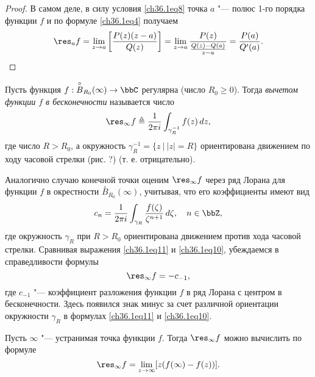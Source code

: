 \begin{proof}
В самом деле, в силу условия \eqref{ch36.1eq8} точка $a$ "--- полюс 1-го порядка функции $f$ и по формуле  \eqref{ch36.1eq4} получаем
\begin{equation*}
\res_{a} f = \lim_{z \to a} \left[ \frac{P(z)(z - a)}{Q(z)}\right] = \lim_{z \to a} \frac{P(z)}{\frac{Q(z) - Q(a)}{z - a}} = \frac{P(a)}{Q'(a)}. \qedhere
\end{equation*}
\end{proof}

\begin{defn} \label{ch36defn2}
Пусть функция $f : \overset{\circ}{B}_{R_0}(\infty) \to \bbC$ регулярна (число $R_0 \ge 0$). Тогда \textit{вычетом функции $f$ в бесконечности} называется число
\begin{equation} \label{ch36.1eq10}
\res_{\infty} f \triangleq \frac{1}{2\pi i} \int_{\gamma_R^{-1}} f(z) \,dz,
\end{equation}
где число $R > R_0$, а окружность $\gamma_R^{-1} = \{ z \: \big| \: |z| = R \}$ ориентирована движением по ходу часовой стрелки (рис. ?) (т. е. отрицательно).
\end{defn}

Аналогично случаю конечной точки оценим $\res_{\infty} f$ через ряд Лорана для функции $f$ в окрестности $\overset{\circ}{B}_{R_0}(\infty)$, учитывая, что его коэффициенты имеют вид
\begin{equation} \label{ch36.1eq11}
c_n = \frac{1}{2\pi i} \int_{\gamma_R} \frac{f(\zeta)}{\zeta^{n + 1}} \,d\zeta, \quad n \in \bbZ,
\end{equation}
где окружность $\gamma_R$ при $R > R_0$ ориентирована движением против хода часовой стрелки. Сравнивая выражения \eqref{ch36.1eq11} и \eqref{ch36.1eq10}, убеждаемся в справедливости формулы
\begin{equation} \label{ch36.1eq12}
\res_{\infty} f = -c_{-1},
\end{equation}
где $c_{-1}$ "--- коэффициент разложения функции $f$ в ряд Лорана с центром в бесконечности. Здесь появился знак минус за счет различной ориентации окружности $\gamma_R$ в формулах \eqref{ch36.1eq11} и \eqref{ch36.1eq10}.

\begin{lemm} \label{ch36.1lemm3}
Пусть $\infty$ "--- устранимая точка функции $f$. Тогда $\res_{\infty} f$ можно вычислить по формуле
\begin{equation} \label{ch36.1eq13}
\res_{\infty} f = \lim_{z \to \infty} [z(f(\infty) - f(z))].
\end{equation}

\end{lemm}

